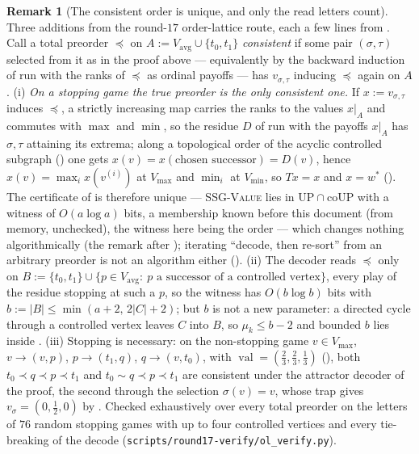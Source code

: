 \documentclass[11pt]{article}
\theoremstyle{plain}
\theoremstyle{definition}
\newtheorem{remark}[theorem]{Remark}
\DeclareMathOperator{\val}{val}
\newcommand{\Vmax}{V_{\max}}
\newcommand{\Vmin}{V_{\min}}
\newcommand{\Vavg}{V_{\mathrm{avg}}}
\begin{document}
\begin{remark}[The consistent order is unique, and only the read letters count]\label{rem:order-unique}
Three additions from the round-$17$ order-lattice route, each a few lines
from .
Call a total preorder $\preceq$ on $A:=\Vavg\cup\{t_0,t_1\}$
\emph{consistent} if some pair $(\sigma,\tau)$ selected from it as in the
proof above --- equivalently by the backward induction of 
run with the ranks of $\preceq$ as ordinal payoffs --- has $v_{\sigma,\tau}$
inducing $\preceq$ again on $A$.
(i) \emph{On a stopping game the true preorder is the only consistent one.}
If $x:=v_{\sigma,\tau}$ induces $\preceq$, a strictly increasing map carries
the ranks to the values $x|_A$ and commutes with $\max$ and $\min$, so the
residue $D$ of  run with the payoffs $x|_A$ has
$\sigma,\tau$ attaining its extrema; along a topological order of the
acyclic controlled subgraph () one gets
$x(v)=x(\text{chosen successor})=D(v)$, hence $x(v)=\max_ix(v^{(i)})$ at
$\Vmax$ and $\min_i$ at $\Vmin$, so $Tx=x$ and $x=w^\ast$
(). The certificate of 
is therefore unique --- \textsc{SSG-Value} lies in $\mathrm{UP}\cap\mathrm{coUP}$
with a witness of $O(a\log a)$ bits, a membership known before this
document (from memory, unchecked), the witness here being the order ---
which changes nothing
algorithmically (the remark after ); iterating
``decode, then re-sort'' from an arbitrary preorder is not an algorithm
either ().
(ii) The decoder reads $\preceq$ only on
$B:=\{t_0,t_1\}\cup\{p\in\Vavg:\ p\text{ a successor of a controlled vertex}\}$,
every play of the residue stopping at such a $p$, so the witness has
$O(b\log b)$ bits with $b:=|B|\le\min(a+2,\,2|C|+2)$; but $b$ is not a
new parameter: a directed cycle through a controlled vertex leaves $C$
into $B$, so $\mu_k\le b-2$ and bounded $b$ lies inside .
(iii) Stopping is necessary: on the non-stopping game $v\in\Vmax$,
$v\to(v,p)$, $p\to(t_1,q)$, $q\to(v,t_0)$, with
$\val=(\tfrac23,\tfrac23,\tfrac13)$ (), both
$t_0\prec q\prec p\prec t_1$ and $t_0\sim q\prec p\prec t_1$ are consistent
under the attractor decoder of the proof, the second through the
selection $\sigma(v)=v$, whose trap gives $v_\sigma=(0,\tfrac12,0)$ by
. Checked exhaustively over every total preorder
on the letters of $76$ random stopping games with up to four controlled
vertices and every tie-breaking of the decode
(\texttt{scripts/round17-verify/ol\_verify.py}).
\end{remark}
\end{document}
